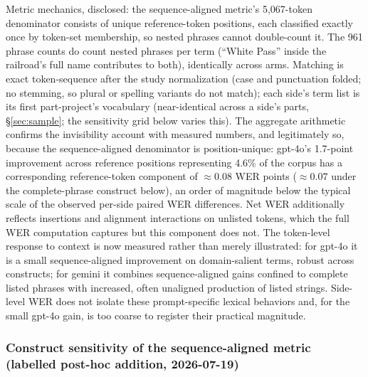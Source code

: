 \documentclass[11pt]{article}
\begin{document}
Metric mechanics, disclosed: the sequence-aligned metric's 5{,}067-token denominator consists of unique reference-token positions, each classified exactly once by token-set membership, so nested phrases cannot double-count it. The 961 phrase counts do count nested phrases per term (``White Pass'' inside the railroad's full name contributes to both), identically across arms. Matching is exact token-sequence after the study normalization (case and punctuation folded; no stemming, so plural or spelling variants do not match); each side's term list is its first part-project's vocabulary (near-identical across a side's parts, \S\ref{sec:sample}; the sensitivity grid below varies this). The aggregate arithmetic confirms the invisibility account with measured numbers, and legitimately so, because the sequence-aligned denominator is position-unique: gpt-4o's 1.7-point improvement across reference positions representing 4.6\% of the corpus has a corresponding reference-token component of ${\approx}0.08$ WER points (${\approx}0.07$ under the complete-phrase construct below), an order of magnitude below the typical scale of the observed per-side paired WER differences. Net WER additionally reflects insertions and alignment interactions on unlisted tokens, which the full WER computation captures but this component does not. The token-level response to context is now measured rather than merely illustrated: for gpt-4o it is a small sequence-aligned improvement on domain-salient terms, robust across constructs; for gemini it combines sequence-aligned gains confined to complete listed phrases with increased, often unaligned production of listed strings. Side-level WER does not isolate these prompt-specific lexical behaviors and, for the small gpt-4o gain, is too coarse to register their practical magnitude.

\subsubsection*{Construct sensitivity of the sequence-aligned metric (labelled post-hoc addition, 2026-07-19)}
\end{document}
